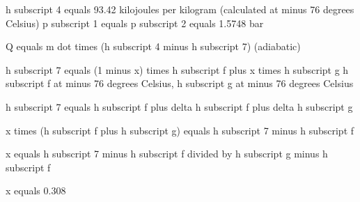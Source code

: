 h subscript 4 equals 93.42 kilojoules per kilogram (calculated at minus 76 degrees Celsius)  
p subscript 1 equals p subscript 2 equals 1.5748 bar  

Q equals m dot times (h subscript 4 minus h subscript 7) (adiabatic)  

h subscript 7 equals (1 minus x) times h subscript f plus x times h subscript g  
h subscript f at minus 76 degrees Celsius, h subscript g at minus 76 degrees Celsius  

h subscript 7 equals h subscript f plus delta h subscript f plus delta h subscript g  

x times (h subscript f plus h subscript g) equals h subscript 7 minus h subscript f  

x equals h subscript 7 minus h subscript f divided by h subscript g minus h subscript f  

x equals 0.308